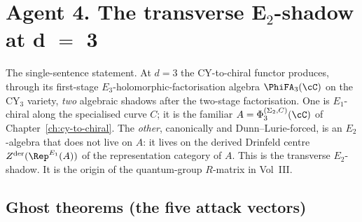 
\section*{Agent 4.  The transverse E$_2$-shadow at d $=$ 3}

The single-sentence statement.  At $d = 3$ the CY-to-chiral functor
produces, through its first-stage $E_3$-holomorphic-factorisation
algebra $\PhiFA_3(\cC)$ on the CY$_3$ variety, \emph{two} algebraic
shadows after the two-stage factorisation.  One is $E_1$-chiral along
the specialised curve $C$; it is the familiar
$A = \Phi_3^{(\Sigma_2, C)}(\cC)$ of Chapter~\ref{ch:cy-to-chiral}.
The \emph{other}, canonically and Dunn--Lurie-forced, is an
$E_2$-algebra that does not live on $A$: it lives on the derived
Drinfeld centre $Z^{\mathrm{der}}(\Rep^{E_1}(A))$ of the representation
category of $A$.  This is the transverse $E_2$-shadow.  It is the
origin of the quantum-group $R$-matrix in Vol~III.

\subsection*{Ghost theorems (the five attack vectors)}

